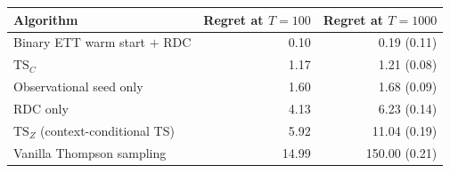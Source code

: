 \begin{tabular}{lrr}
\toprule
Algorithm & Regret at $T = 100$ & Regret at $T = 1000$ \\
\midrule
Binary ETT warm start $+$ RDC & 0.10 & 0.19 (0.11) \\
$\mathrm{TS}_C$ \citep{bareinboim2015mabuc} & 1.17 & 1.21 (0.08) \\
Observational seed only & 1.60 & 1.68 (0.09) \\
RDC only & 4.13 & 6.23 (0.14) \\
$\mathrm{TS}_Z$ (context-conditional TS) & 5.92 & 11.04 (0.19) \\
Vanilla Thompson sampling & 14.99 & 150.00 (0.21) \\
\bottomrule
\end{tabular}

